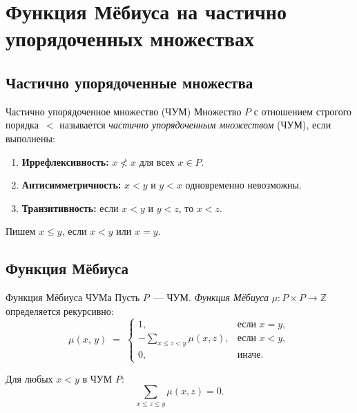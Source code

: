 
\section{Функция Мёбиуса на частично упорядоченных множествах}


\subsection{Частично упорядоченные множества}

\begin{Definition}{Частично упорядоченное множество (ЧУМ)}{}
	Множество $P$ с отношением строгого порядка~$<$ называется
	\emph{частично упорядоченным множеством} (ЧУМ), если выполнены:
	\begin{enumerate}
		\item \textbf{Иррефлексивность:} $x \not< x$ для всех $x \in P$.
		\item \textbf{Антисимметричность:} $x < y$ и $y < x$ одновременно невозможны.
		\item \textbf{Транзитивность:} если $x < y$ и $y < z$, то $x < z$.
	\end{enumerate}
	Пишем $x \leq y$, если $x < y$ или $x = y$.
\end{Definition}

\subsection{Функция Мёбиуса}

\begin{Definition}{Функция Мёбиуса ЧУМа}{}
	Пусть $P$~--- ЧУМ. \emph{Функция Мёбиуса} $\mu \colon P \times P \to \mathbb{Z}$
	определяется рекурсивно:
	\[
	\mu(x,\, y)
	\;=\;
	\begin{cases}
		1,
		& \text{если } x = y,\\[6pt]
		-\displaystyle\sum_{x \leq z < y}\mu(x,z),
		& \text{если } x < y,\\[6pt]
		0,
		& \text{иначе.}
	\end{cases}
	\]
\end{Definition}

\begin{Corollary}{}{}
	Для любых $x < y$ в ЧУМ $P$:
	\[
	\sum_{x \leq z \leq y} \mu(x, z) = 0.
	\]
\end{Corollary}

